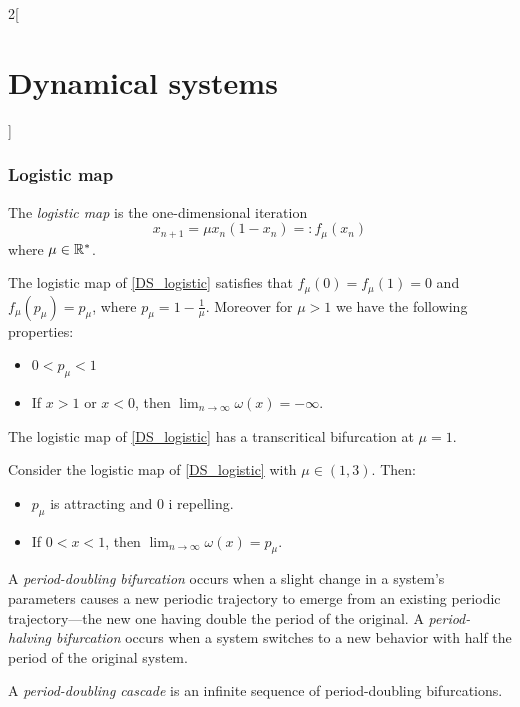 \documentclass[../../../main_math.tex]{subfiles}
\begin{document}
\begin{multicols}{2}[\section{Dynamical systems}]
  \subsubsection{Logistic map}
  \begin{definition}
    The \emph{logistic map} is the one-dimensional iteration
    \begin{equation}\label{DS_logistic}
      x_{n+1}=\mu x_n(1-x_n)=:f_\mu(x_n)
    \end{equation}
    where $\mu\in\mathbb{R}^*$.
  \end{definition}
  \begin{proposition}
    The logistic map of \cref{DS_logistic} satisfies that $f_\mu(0)=f_\mu(1)=0$ and $f_\mu(p_\mu)=p_\mu$, where $p_\mu=1-\frac{1}{\mu}$. Moreover for $\mu > 1$ we have the following properties:
    \begin{itemize}
      \item $0<p_\mu<1$
      \item If $x>1$ or $x<0$, then $\displaystyle\lim_{n\to\infty} \omega(x)=-\infty$.
    \end{itemize}
  \end{proposition}
  \begin{proposition}
    The logistic map of \cref{DS_logistic} has a transcritical bifurcation at $\mu = 1$.
  \end{proposition}
  \begin{proposition}
    Consider the logistic map of \cref{DS_logistic} with $\mu\in(1,3)$. Then:
    \begin{itemize}
      \item $p_\mu$ is attracting and 0 i repelling.
      \item If $0<x<1$, then $\displaystyle\lim_{n\to\infty} \omega(x)=p_\mu$.
    \end{itemize}
  \end{proposition}
  \begin{definition}
    A \emph{period-doubling bifurcation} occurs when a slight change in a system's parameters causes a new periodic trajectory to emerge from an existing periodic trajectory—the new one having double the period of the original. A \emph{period-halving bifurcation} occurs when a system switches to a new behavior with half the period of the original system.
  \end{definition}
  \begin{definition}
    A \emph{period-doubling cascade} is an infinite sequence of period-doubling bifurcations.

\end{definition}
\end{multicols}
\end{document}
